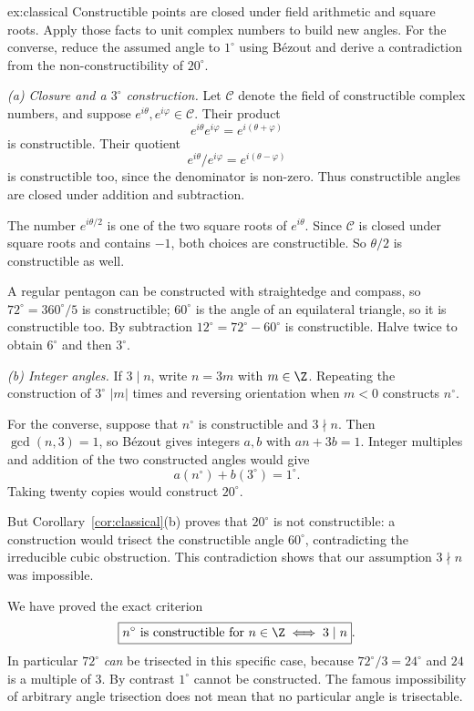 \begin{solution}{ex:classical}
\idea Constructible points are closed under field arithmetic and square roots. Apply those facts to unit complex numbers to build new angles. For the converse, reduce the assumed angle to $1^\circ$ using Bézout and derive a contradiction from the non-constructibility of $20^\circ$.

\writeup \emph{(a) Closure and a $3^\circ$ construction.} Let $\mathcal C$ denote the field of constructible complex numbers, and suppose $e^{i\theta},e^{i\varphi}\in\mathcal C$. Their product
\[
e^{i\theta}e^{i\varphi}=e^{i(\theta+\varphi)}
\]
is constructible. Their quotient
\[
e^{i\theta}/e^{i\varphi}=e^{i(\theta-\varphi)}
\]
is constructible too, since the denominator is non-zero. Thus constructible angles are closed under addition and subtraction.

The number $e^{i\theta/2}$ is one of the two square roots of $e^{i\theta}$. Since $\mathcal C$ is closed under square roots and contains $-1$, both choices are constructible. So $\theta/2$ is constructible as well.

A regular pentagon can be constructed with straightedge and compass, so $72^\circ=360^\circ/5$ is constructible; $60^\circ$ is the angle of an equilateral triangle, so it is constructible too. By subtraction $12^\circ=72^\circ-60^\circ$ is constructible. Halve twice to obtain $6^\circ$ and then $3^\circ$.

\emph{(b) Integer angles.} If $3\mid n$, write $n=3m$ with $m\in\Z$. Repeating the construction of $3^\circ$ $|m|$ times and reversing orientation when $m<0$ constructs $n^\circ$.

For the converse, suppose that $n^\circ$ is constructible and $3\nmid n$.
Then $\gcd(n,3)=1$, so Bézout gives integers $a,b$ with $an+3b=1$.
Integer multiples and addition of the two constructed angles would give
\[
a(n^\circ)+b(3^\circ)=1^\circ.
\]
Taking twenty copies would construct $20^\circ$.

But Corollary~\ref{cor:classical}(b) proves that $20^\circ$ is not constructible: a construction would trisect the constructible angle $60^\circ$, contradicting the irreducible cubic obstruction. This contradiction shows that our assumption $3\nmid n$ was impossible.

We have proved the exact criterion
\[
\boxed{n^\circ\text{ is constructible for }n\in\Z
\iff 3\mid n}.
\]
In particular $72^\circ$ \emph{can} be trisected in this specific case, because $72^\circ/3=24^\circ$ and $24$ is a multiple of $3$. By contrast $1^\circ$ cannot be constructed. The famous impossibility of arbitrary angle trisection does not mean that no particular angle is trisectable.
\end{solution}

